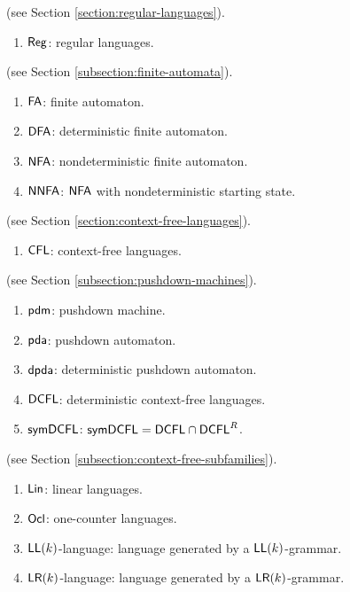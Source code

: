  (see Section \ref{section:regular-languages}).

\begin{enumerate}[]
\item $\textup{\sf Reg}$: regular languages.
\end{enumerate}

 (see Section \ref{subsection:finite-automata}).

\begin{enumerate}[]
\item $\textup{\sf FA}$: finite automaton.
\item $\textup{\sf DFA}$: deterministic finite automaton.
\item $\textup{\sf NFA}$: nondeterministic finite automaton.
\item $\textup{\sf NNFA}$: $\textup{\sf NFA}$ with nondeterministic starting state.
\end{enumerate}

 (see Section \ref{section:context-free-languages}).

\begin{enumerate}[]
\item $\textup{\sf CFL}$: context-free languages.
\end{enumerate}

 (see Section \ref{subsection:pushdown-machines}).

\begin{enumerate}[]
\item $\textup{\sf pdm}$: pushdown machine.
\item $\textup{\sf pda}$: pushdown automaton.
\item $\textup{\sf dpda}$: deterministic pushdown automaton.
\item $\textup{\sf DCFL}$: deterministic context-free languages.
\item $\textup{\sf symDCFL}$: $\textup{\sf symDCFL} = \textup{\sf DCFL}\cap\textup{\sf DCFL}^R$.
\end{enumerate}


 (see Section \ref{subsection:context-free-subfamilies}).

\begin{enumerate}[]
\item $\textup{\sf Lin}$: linear languages.
\item $\textup{\sf Ocl}$: one-counter languages.
\item $\textup{\sf LL}(k)$-language: language generated by a $\textup{\sf LL}(k)$-grammar.
\item $\textup{\sf LR}(k)$-language: language generated by a $\textup{\sf LR}(k)$-grammar.
\end{enumerate}

